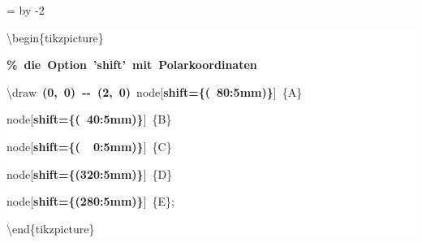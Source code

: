 \begingroup
\ttfamily
{}
=\textwidth
\advance{} by -2\fboxsep
\noindent
\colorbox{background}
{%
\parbox{\dimen255}
{%
\rule[-0.5ex]{0pt}{2.5ex}\hspace*{0.0em}\textbackslash{}begin\{tikzpicture\}\\
\rule[-0.5ex]{0pt}{2.5ex}\hspace*{1.0em}\textcolor{G}{\textbf{\%~die~Option~'shift'~mit~Polarkoordinaten}}\\
\rule[-0.5ex]{0pt}{2.5ex}\hspace*{1.0em}\textbackslash{}draw~\textcolor{B}{\textbf{(0,~0)~{-}{-}~(2,~0)}}~node[\textcolor{R}{\textbf{shift=\{(~80:5mm)\}}}]~\{A\}\\
\rule[-0.5ex]{0pt}{2.5ex}\hspace*{12.5em}node[\textcolor{R}{\textbf{shift=\{(~40:5mm)\}}}]~\{B\}\\
\rule[-0.5ex]{0pt}{2.5ex}\hspace*{12.5em}node[\textcolor{R}{\textbf{shift=\{(~~0:5mm)\}}}]~\{C\}\\
\rule[-0.5ex]{0pt}{2.5ex}\hspace*{12.5em}node[\textcolor{R}{\textbf{shift=\{(320:5mm)\}}}]~\{D\}\\
\rule[-0.5ex]{0pt}{2.5ex}\hspace*{12.5em}node[\textcolor{R}{\textbf{shift=\{(280:5mm)\}}}]~\{E\};\\
\rule[-0.5ex]{0pt}{2.5ex}\hspace*{0.0em}\textbackslash{}end\{tikzpicture\}}%
}%
\endgroup
